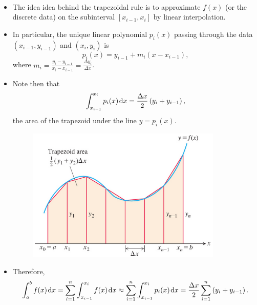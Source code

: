 \begin{remark}\,
\begin{itemize}
\item The idea idea behind the trapezoidal rule is to approximate $f(x)$ (or the discrete data) on the subinterval $[x_{i-1}, x_i]$ by linear interpolation.
\item In particular, the unique linear polynomial $p_i(x)$ passing through the data $(x_{i-1}, y_{i-1})$ and $(x_i, y_i)$ is
\begin{equation*}
p_i(x) = y_{i-1} + m_i(x-x_{i-1}),
\end{equation*}
where $m_i = \frac{y_i - y_{i-1}}{x_i-x_{i-1}} = \frac{\Delta y_i}{\Delta x}$.
\item Note then that
\begin{equation*}
\int_{x_{i-1}}^{x_i} p_i(x)\mkern 2mu \mathrm{d} x
 = \frac{\Delta x}{2}\left( y_i + y_{i-1}\right),
\end{equation*}
the area of the trapezoid under the line $y=p_i(x)$.
\begin{figure}[H]
\includegraphics[height=2.5in]{img/trapezoidal_rule}
\end{figure}
\item  Therefore,
\begin{equation*}
\int_a^bf(x)\mkern 2mu \mathrm{d} x 
= \sum_{i=1}^n\int_{x_{i-1}}^{x_i} f(x)\mkern 2mu \mathrm{d} x
\approx \sum_{i=1}^n\int_{x_{i-1}}^{x_i} p_i(x)\mkern 2mu \mathrm{d} x
= \frac{\Delta x}{2}\sum_{i=1}^n\left(y_i+y_{i-1}\right).
\end{equation*}
\end{itemize}
\end{remark}


